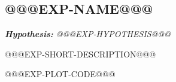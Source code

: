 \subsection{@@@EXP-NAME@@@}

	\textit{\textbf{Hypothesis:} @@@EXP-HYPOTHESIS@@@}
	\vspace{0.5cm}

	@@@EXP-SHORT-DESCRIPTION@@@

	@@@EXP-PLOT-CODE@@@
	\newpage

